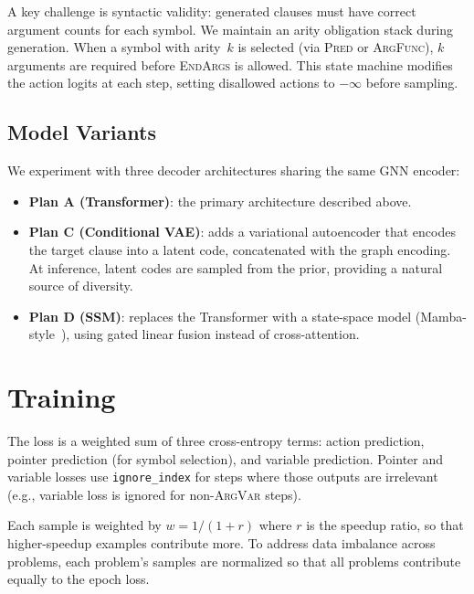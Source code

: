 \documentclass{easychair}
\begin{document}
A key challenge is syntactic validity: generated clauses must have
correct argument counts for each symbol.  We maintain an arity
obligation stack during generation.  When a symbol with arity~$k$ is
selected (via \textsc{Pred} or \textsc{ArgFunc}), $k$ arguments are
required before \textsc{EndArgs} is allowed.  This state machine
modifies the action logits at each step, setting disallowed actions to
$-\infty$ before sampling.

\subsection{Model Variants}

We experiment with three decoder architectures sharing the same GNN
encoder:
\begin{itemize}
\item \textbf{Plan A (Transformer)}: the primary architecture
  described above.
\item \textbf{Plan C (Conditional VAE)}: adds a variational
  autoencoder that encodes the target clause into a latent code,
  concatenated with the graph encoding.  At inference, latent codes
  are sampled from the prior, providing a natural source of diversity.
\item \textbf{Plan D (SSM)}: replaces the Transformer with a
  state-space model (Mamba-style~\cite{Gu2024}), using gated linear
  fusion instead of cross-attention.
\end{itemize}


\section{Training}
\label{sec:training}

The loss is a weighted sum of three cross-entropy terms: action
prediction, pointer prediction (for symbol selection), and variable
prediction.  Pointer and variable losses use \texttt{ignore\_index}
for steps where those outputs are irrelevant (e.g., variable loss is
ignored for non-\textsc{ArgVar} steps).

Each sample is weighted by $w = 1/(1 + r)$ where $r$ is the speedup
ratio, so that higher-speedup examples contribute more.  To address
data imbalance across problems, each problem's samples are normalized
so that all problems contribute equally to the epoch loss.
\end{document}
